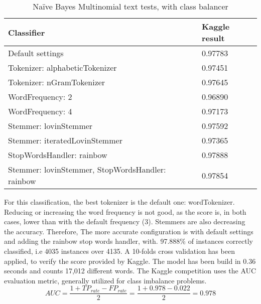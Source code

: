 \documentclass[runningheads]{llncs}
\begin{document}
%
\begin{table}
\caption{Naïve Bayes Multinomial text tests, with class balancer}\label{tab6}
\centering
\begin{tabular}{|l|l|l|}
\hline
Classifier && Kaggle result \\
\hline \hline
Default settings && 0.97783 \\\hline
Tokenizer: alphabeticTokenizer && 0.97451 \\\hline
Tokenizer: nGramTokenizer && 0.97645 \\\hline
WordFrequency: 2 && 0.96890 \\\hline
WordFrequency: 4 && 0.97173 \\\hline
Stemmer: lovinStemmer && 0.97592 \\\hline
Stemmer: iteratedLovinStemmer && 0.97365 \\\hline
StopWordsHandler: rainbow && 0.97888 \\\hline
Stemmer: lovinStemmer, StopWordsHandler: rainbow && 0.97854 \\\hline
\hline
\end{tabular}
\end{table}
%
For this classification, the best tokenizer is the default one: wordTokenizer. Reducing or increasing the word frequency is not good, as the score is, in both cases, lower than with the default frequency (3). Stemmers are also decreasing the accuracy. Therefore, The more accurate configuration is with default settings and adding the rainbow stop words handler, with. 97.888\% of instances correctly classified, i.e 4035 instances over 4135. A 10-folds cross validation has been applied, to verify the score provided by Kaggle. The model has been build in 0.36 seconds and counts 17,012 different words. The Kaggle competition uses the AUC evaluation metric, generally utilized for class imbalance problems. 
%
\begin{equation}
AUC = \frac{1 + TP_{rate} - FP_{rate}}{2} = \frac{1 + 0.978 - 0.022}{2} = 0.978
\end{equation}

%
%
%
\end{document}

